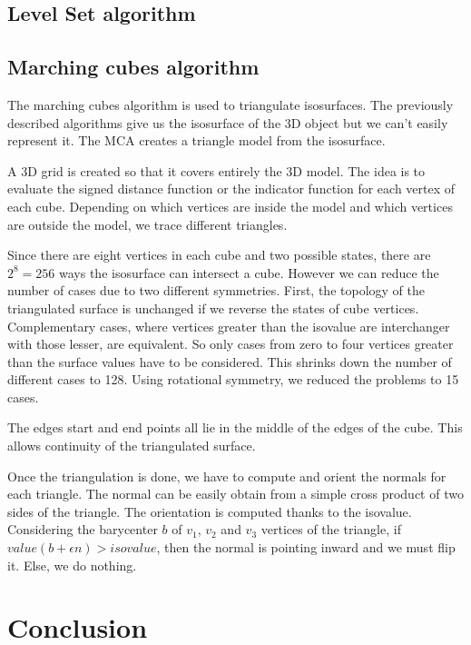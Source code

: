 \documentclass[a4paper]{article}
\begin{document}
\subsection{Level Set algorithm}


\subsection{Marching cubes algorithm}
\label{subsec:mca}
The marching cubes algorithm is used to triangulate isosurfaces. The previously described algorithms give us the isosurface of the 3D object but we can't easily represent it. The MCA creates a triangle model from the isosurface.

A 3D grid is created so that it covers entirely the 3D model. The idea is to evaluate the signed distance function or the indicator function for each vertex of each cube. Depending on which vertices are inside the model and which vertices are outside the model, we trace different triangles.

Since there are eight vertices in each cube and two possible states, there are $2^8 = 256$ ways the isosurface can intersect a cube. However we can reduce the number of cases due to two different symmetries. First, the topology of the triangulated surface is unchanged if we reverse the states of cube vertices. Complementary cases, where vertices greater than the isovalue are interchanger with those lesser, are equivalent. So only cases from zero to four vertices greater than the surface values have to be considered. This shrinks down the number of different cases to 128. Using rotational symmetry, we reduced the problems to 15 cases.


The edges start and end points all lie in the middle of the edges of the cube. This allows continuity of the triangulated surface.

Once the triangulation is done, we have to compute and orient the normals for each triangle. The normal can be easily obtain from a simple cross product of two sides of the triangle. The orientation is computed thanks to the isovalue. Considering the barycenter $b$ of $v_1$, $v_2$ and $v_3$ vertices of the triangle, if $value(b + \epsilon n) > isovalue$, then the normal is pointing inward and we must flip it. Else, we do nothing.

\section*{Conclusion}
\end{document}
